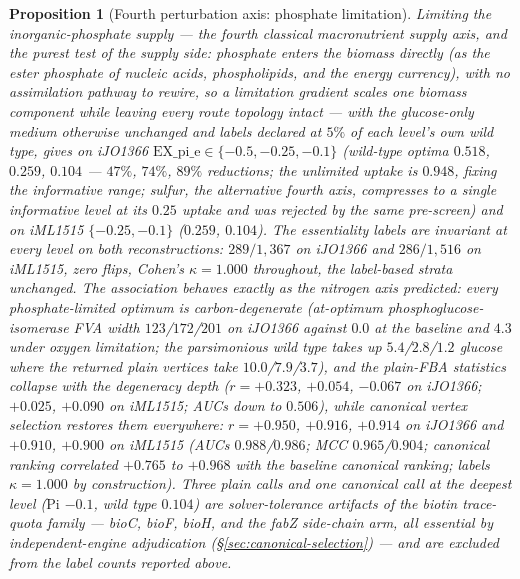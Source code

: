 \documentclass[11pt,a4paper]{article}
\theoremstyle{plain}
\newtheorem{proposition}[theorem]{Proposition}
\theoremstyle{definition}
\theoremstyle{remark}
\begin{document}
\begin{proposition}[Fourth perturbation axis: phosphate limitation]
\label{prop:keio-phosphate}
Limiting the inorganic-phosphate supply --- the fourth classical
macronutrient supply axis, and the purest test of the supply side:
phosphate enters the biomass directly (as the ester phosphate of
nucleic acids, phospholipids, and the energy currency), with no
assimilation pathway to rewire, so a limitation gradient scales one
biomass component while leaving every route topology intact ---
with the glucose-only medium otherwise unchanged and labels declared
at $5\%$ of each level's own wild type, gives on iJO1366
$\mathrm{EX\_pi\_e}\in\{-0.5,-0.25,-0.1\}$ (wild-type optima
$0.518$, $0.259$, $0.104$ --- $47\%$, $74\%$, $89\%$ reductions; the
unlimited uptake is $0.948$, fixing the informative range; sulfur,
the alternative fourth axis, compresses to a single informative
level at its $0.25$ uptake and was rejected by the same pre-screen)
and on iML1515 $\{-0.25,-0.1\}$ ($0.259$, $0.104$). The
essentiality labels are invariant at every level on both
reconstructions: $289/1{,}367$ on iJO1366 and $286/1{,}516$ on
iML1515, zero flips, Cohen's $\kappa=1.000$ throughout, the
label-based strata unchanged. The association behaves exactly as
the nitrogen axis predicted: every phosphate-limited optimum is
carbon-degenerate (at-optimum phosphoglucose-isomerase FVA width
$123$/$172$/$201$ on iJO1366 against $0.0$ at the baseline and
$4.3$ under oxygen limitation; the parsimonious wild type takes up
$5.4$/$2.8$/$1.2$ glucose where the returned plain vertices take
$10.0$/$7.9$/$3.7$), and the plain-FBA statistics collapse with the
degeneracy depth ($r=+0.323$, $+0.054$, $-0.067$ on iJO1366;
$+0.025$, $+0.090$ on iML1515; AUCs down to $0.506$), while
canonical vertex selection restores them everywhere: $r=+0.950$,
$+0.916$, $+0.914$ on iJO1366 and $+0.910$, $+0.900$ on iML1515
(AUCs $0.988$/$0.986$; MCC $0.965$/$0.904$; canonical ranking
correlated $+0.765$ to $+0.968$ with the baseline canonical
ranking; labels $\kappa=1.000$ by construction). Three plain calls
and one canonical call at the deepest level ($\mathrm{Pi}$ $-0.1$,
wild type $0.104$) are solver-tolerance artifacts of the biotin
trace-quota family --- \emph{bioC}, \emph{bioF}, \emph{bioH}, and
the \emph{fabZ} side-chain arm, all essential by independent-engine
adjudication (\S\ref{sec:canonical-selection}) --- and are excluded
from the label counts reported above.
\end{proposition}
\end{document}
